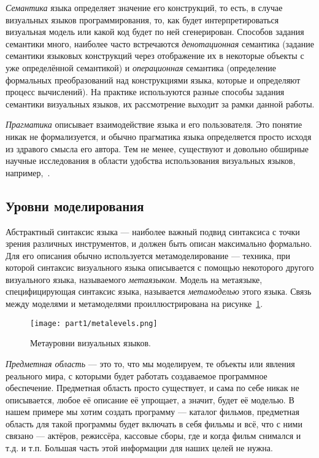 \textit{Семантика} языка определяет значение его конструкций, то есть, в случае визуальных
языков программирования, то, как будет интерпретироваться визуальная модель или какой
код будет по ней сгенерирован. Способов задания семантики много, наиболее часто встречаются
\textit{денотационная} семантика (задание семантики языковых конструкций через отображение их
в некоторые объекты с уже определённой семантикой) и \textit{операционная} семантика
(определение формальных преобразований над конструкциями языка, которые и определяют процесс вычислений).
На практике используются разные способы задания семантики визуальных языков, их рассмотрение 
выходит за рамки данной работы.

\textit{Прагматика} описывает взаимодействие языка и его пользователя. Это понятие никак
не формализуется, и обычно прагматика языка определяется просто исходя из здравого
смысла его автора. Тем не менее, существуют и довольно обширные научные исследования
в области удобства использования визуальных языков, например,~\cite{parondzhanov2001drakon}.

\subsection{Уровни моделирования}
Абстрактный синтаксис языка --- наиболее важный подвид синтаксиса с точки зрения 
различных инструментов, и должен быть описан максимально формально. Для его 
описания обычно используется метамоделирование --- техника, при которой 
синтаксис визуального языка описывается с помощью некоторого другого 
визуального языка, называемого \textit{метаязыком}. Модель на метаязыке, специфицирующая 
синтаксис языка, называется \textit{метамоделью} этого языка. Связь между моделями и 
метамоделями проиллюстрирована на рисунке~\ref{metalevels}.

\begin{figure} [ht]
	\begin{center}
		\texttt{[image: part1/metalevels.png]}
		\caption{Метауровни визуальных языков.}
		\label{metalevels}
	\end{center}
\end{figure}

\textit{Предметная область} --- это то, что мы моделируем, те объекты или явления 
реального мира, с которыми будет работать создаваемое программное обеспечение. 
Предметная область просто существует, и сама по себе никак не описывается, любое 
её описание её упрощает, а значит, будет её моделью. В нашем примере мы хотим 
создать программу --- каталог фильмов, предметная область для такой программы 
будет включать в себя фильмы и всё, что с ними связано --- актёров, режиссёра, 
кассовые сборы, где и когда фильм снимался и т.д. и т.п. Большая часть этой 
информации для наших целей не нужна.


